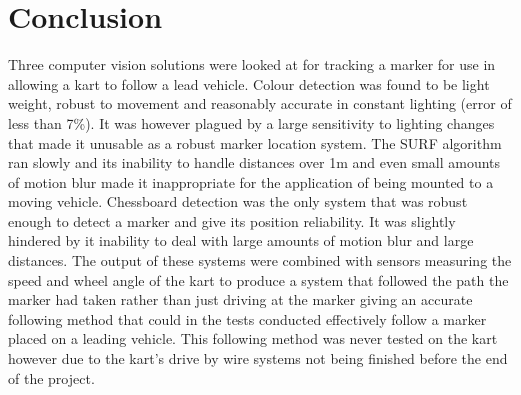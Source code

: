 \section{Conclusion}

Three computer vision solutions were looked at for tracking a marker for use in allowing a kart to follow a lead vehicle. Colour detection was found to be light weight, robust to movement and reasonably accurate in constant lighting (error of less than 7\%). It was however plagued by a large sensitivity to lighting changes that made it unusable as a robust marker location system. The SURF algorithm ran slowly and its inability to handle distances over 1m and even small amounts of motion blur made it inappropriate for the application of being mounted to a moving vehicle. Chessboard detection was the only system that was robust enough to detect a marker and give its position reliability. It was slightly hindered by it inability to deal with large amounts of motion blur and large distances. The output of these systems were combined with sensors measuring the speed and wheel angle of the kart to produce a system that followed the path the marker had taken rather than just driving at the marker giving an accurate following method that could in the tests conducted effectively follow a marker placed on a leading vehicle. This following method was never tested on the kart however due to the kart’s drive by wire systems not being finished before the end of the project.